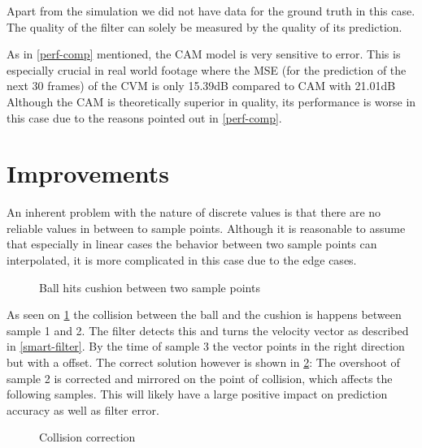 \documentclass[notitlepage, a4paper, 11pt]{scrartcl}
\begin{document}
\begin{multicols}{2}
Apart from the simulation we did not have data for the ground truth in this case. 
The quality of the filter can solely be measured by the quality of its prediction. 

As in \cref{perf-comp} mentioned, the CAM model is very sensitive to error. This is especially crucial in real world footage where the MSE (for the prediction of the next 30 frames) of the CVM is only 15.39dB compared to CAM with 21.01dB
Although the CAM is theoretically superior in quality, its performance is worse in this case due to the reasons pointed out in \cref{perf-comp}.

\section{Improvements}

An inherent problem with the nature of discrete values is that there are no reliable values in between to sample points. 
Although it is reasonable to assume that especially in linear cases the behavior between two sample points can interpolated, 
it is more complicated in this case due to the edge cases.

\begin{figure}[H]
    \centering
    \caption{Ball hits cushion between two sample points}
    \label{fig:edge-case}
\end{figure}

As seen on \cref{fig:edge-case} the collision between the ball and the cushion is happens between sample 1 and 2. 
The filter detects this and turns the velocity vector as described in \cref{smart-filter}.
By the time of sample 3 the vector points in the right direction but with a offset. The correct solution however is shown in \cref{fig:edge-case-sol}:
The overshoot of sample 2 is corrected and mirrored on the point of collision, which affects the following samples. 
This will likely have a large positive impact on prediction accuracy as well as filter error.

\begin{figure}[H]
    \centering
    \caption{Collision correction}
    \label{fig:edge-case-sol}
\end{figure}


\end{multicols}
\end{document}
